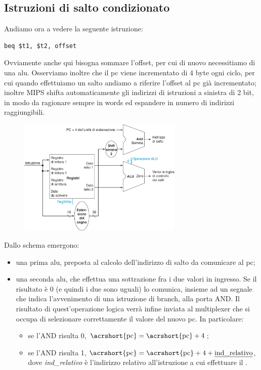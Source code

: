 \documentclass[class=book, crop=false, oneside]{standalone}
\begin{document}
\subsection{Istruzioni di salto condizionato}
Andiamo ora a vedere la seguente istruzione:
\begin{verbatim}
beq $t1, $t2, offset
\end{verbatim}
Ovviamente anche qui bisogna sommare l'offset, per cui di nuovo necessitiamo di una \acrshort{alu}. Osserviamo inoltre che il \acrshort{pc} viene incrementato di 4 byte ogni ciclo, per cui quando effettuiamo un salto andiamo a riferire l'offset al \acrshort{pc} già incrementato; inoltre MIPS shifta automaticamente gli indirizzi di istruzioni a sinistra di 2 bit, in modo da ragionare sempre in words ed espandere in numero di indirizzi raggiungibili.
\begin{figure}[H]
	\centering
	\includegraphics[width=0.7\textwidth,keepaspectratio]{jump.png}
\end{figure}

Dallo schema emergono:
\begin{itemize}
	\item una prima \acrshort{alu}, preposta al calcolo dell'indirizzo di salto da comunicare al \acrshort{pc};
	\item una seconda \acrshort{alu}, che effettua una sottrazione fra i due valori in ingresso. Se il risultato è 0 (e quindi i due sono uguali) lo comunica, insieme ad un segnale che indica l'avvenimento di una istruzione di branch, alla porta AND. Il risultato di quest'operazione logica verrà infine inviata al multiplexer che si occupa di selezionare correttamente il valore del nuovo \acrshort{pc}. In particolare:
	\begin{itemize}
		\item se l'AND risulta 0, \(\textrm{\acrshort{pc}}=\textrm{\acrshort{pc}}+4\);
		\item se l'AND risulta 1, \(\textrm{\acrshort{pc}}=\textrm{\acrshort{pc}}+4+\textrm{\emph{ind\_relativo}}\), dove \emph{ind\_relativo} è l'indirizzo relativo all'istruzione a cui effettuare il .
	\end{itemize}
\end{itemize}
\end{document}
